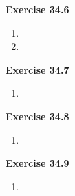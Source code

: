 \textbf{Exercise 34.6}
\begin{enumerate}
    \item 
    \item 
\end{enumerate}

\textbf{Exercise 34.7}
\begin{enumerate}
    \item 
\end{enumerate}

\textbf{Exercise 34.8}
\begin{enumerate}
    \item 
\end{enumerate}

\textbf{Exercise 34.9}
\begin{enumerate}
    \item 
\end{enumerate}

